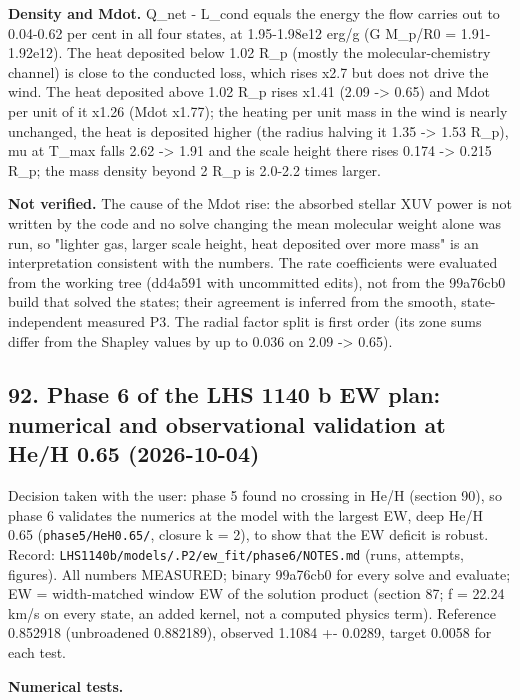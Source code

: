 \documentclass[english,a4paper]{my_memo}
\begin{document}
\textbf{Density and Mdot.} Q\_net - L\_cond equals the energy the flow carries out
to 0.04-0.62 per cent in all four states, at 1.95-1.98e12 erg/g
(G M\_p/R0 = 1.91-1.92e12). The heat deposited below 1.02 R\_p (mostly the
molecular-chemistry channel) is close to the conducted loss, which rises
x2.7 but does not drive the wind. The heat deposited above 1.02 R\_p rises
x1.41 (2.09 -\textgreater{} 0.65) and Mdot per unit of it x1.26 (Mdot x1.77); the
heating per unit mass in the wind is nearly unchanged, the heat is
deposited higher (the radius halving it 1.35 -\textgreater{} 1.53 R\_p), mu at T\_max
falls 2.62 -\textgreater{} 1.91 and the scale height there rises 0.174 -\textgreater{} 0.215 R\_p;
the mass density beyond 2 R\_p is 2.0-2.2 times larger.

\textbf{Not verified.} The cause of the Mdot rise: the absorbed stellar XUV
power is not written by the code and no solve changing the mean molecular
weight alone was run, so "lighter gas, larger scale height, heat deposited
over more mass" is an interpretation consistent with the numbers. The
rate coefficients were evaluated from the working tree (dd4a591 with
uncommitted edits), not from the 99a76cb0 build that solved the states;
their agreement is inferred from the smooth, state-independent measured
P3. The radial factor split is first order (its zone sums differ from the
Shapley values by up to 0.036 on 2.09 -\textgreater{} 0.65).

\subsection{92. Phase 6 of the LHS 1140 b EW plan: numerical and observational validation at He/H 0.65 (2026-10-04)}\label{92-phase-6-of-the-lhs-1140-b-ew-plan-numerical-and-observational-validation-at-heh-065-2026-10-04}

Decision taken with the user: phase 5 found no crossing in He/H (section 90),
so phase 6 validates the numerics at the model with the largest EW, deep
He/H 0.65 (\texttt{phase5/HeH0.65/}, closure k = 2), to show that the EW deficit is
robust. Record: \texttt{LHS1140b/models/.P2/ew\_fit/phase6/NOTES.md} (runs, attempts,
figures). All numbers MEASURED; binary 99a76cb0 for every solve and evaluate;
EW = width-matched window EW of the solution product (section 87; f = 22.24
km/s on every state, an added kernel, not a computed physics term).
Reference 0.852918 (unbroadened 0.882189), observed 1.1084 +- 0.0289, target
0.0058 for each test.

\textbf{Numerical tests.}
\end{document}

